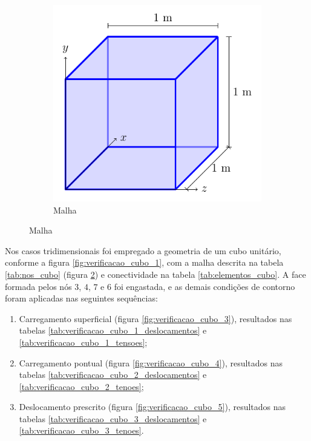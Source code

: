 \begin{figure}
\begin{subfigure}[b]{0.45\textwidth}
        \includegraphics[page=2]{Figuras/verificacao_cubo.pdf}
        \caption{Malha}
        \label{fig:verificacao_cubo_2}
    \end{subfigure}
\end{figure}

Nos casos tridimensionais foi empregado a geometria de um cubo unitário, conforme a figura \ref{fig:verificacao_cubo_1}, com a malha descrita na tabela \ref{tab:nos_cubo} (figura \ref{fig:verificacao_cubo_2}) e conectividade na tabela \ref{tab:elementos_cubo}. A face formada pelos nós $3$, $4$, $7$ e $6$ foi engastada, e as demais condições de contorno foram aplicadas nas seguintes sequências:

\begin{enumerate}
    \item Carregamento superficial (figura \ref{fig:verificacao_cubo_3}), resultados nas tabelas \ref{tab:verificacao_cubo_1_deslocamentos} e \ref{tab:verificacao_cubo_1_tensoes};
    \item Carregamento pontual (figura \ref{fig:verificacao_cubo_4}), resultados nas tabelas \ref{tab:verificacao_cubo_2_deslocamentos} e \ref{tab:verificacao_cubo_2_tenoes};
    \item Deslocamento prescrito (figura \ref{fig:verificacao_cubo_5}), resultados nas tabelas \ref{tab:verificacao_cubo_3_deslocamentos} e \ref{tab:verificacao_cubo_3_tenoes}.
\end{enumerate}


